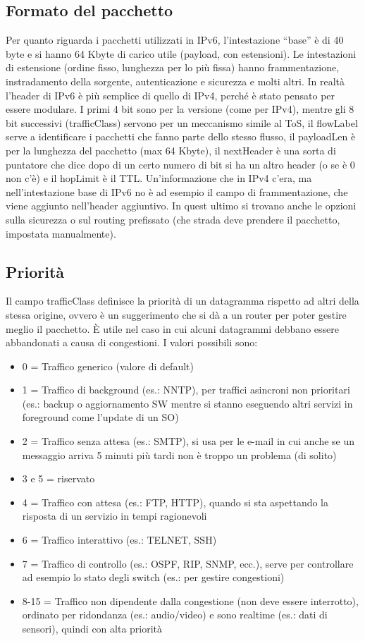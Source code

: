 \subsection{Formato del pacchetto}
Per quanto riguarda i pacchetti utilizzati in IPv6, l’intestazione “base” è di 40 byte e si hanno 64 Kbyte di carico utile (payload, con estensioni). Le intestazioni di estensione (ordine fisso, lunghezza per lo più fissa) hanno frammentazione, instradamento della sorgente, autenticazione e sicurezza e molti altri. In realtà l’header di IPv6 è più semplice di quello di IPv4, perché è stato pensato per essere modulare. I primi 4 bit sono per la versione (come per IPv4), mentre gli 8 bit successivi (trafficClass) servono per un meccanismo simile al ToS, il flowLabel serve a identificare i pacchetti che fanno parte dello stesso flusso, il payloadLen è per la lunghezza del pacchetto (max 64 Kbyte), il nextHeader è una sorta di puntatore che dice dopo di un certo numero di bit si ha un altro header (o se è 0 non c’è) e il hopLimit è il TTL. Un’informazione che in IPv4 c’era, ma nell’intestazione base di IPv6 no è ad esempio il campo di frammentazione, che viene aggiunto nell’header aggiuntivo. In quest ultimo si trovano anche le opzioni sulla sicurezza o sul routing prefissato (che strada deve prendere il pacchetto, impostata manualmente).
\subsection{Priorità}
Il campo trafficClass definisce la priorità di un datagramma rispetto ad altri della stessa origine, ovvero è un suggerimento che si dà a un router per poter gestire meglio il pacchetto. È utile nel caso in cui alcuni datagrammi debbano essere abbandonati a causa di congestioni. I valori possibili sono:
\begin{itemize}
  \item 0 = Traffico generico (valore di default)
  \item 1 = Traffico di background (es.: NNTP), per traffici asincroni non prioritari (es.: backup o aggiornamento SW mentre si stanno eseguendo altri servizi in foreground come l’update di un SO)
  \item 2 = Traffico senza attesa (es.: SMTP), si usa per le e-mail in cui anche se un messaggio arriva 5 minuti più tardi non è troppo un problema (di solito)
  \item 3 e 5 = riservato
  \item 4 = Traffico con attesa (es.: FTP, HTTP), quando si sta aspettando la risposta di un servizio in tempi ragionevoli
  \item 6 = Traffico interattivo (es.: TELNET, SSH)
  \item 7 = Traffico di controllo (es.: OSPF, RIP, SNMP, ecc.), serve per controllare ad esempio lo stato degli switch (es.: per gestire congestioni)
  \item 8-15 = Traffico non dipendente dalla congestione (non deve essere interrotto), ordinato per ridondanza (es.: audio/video) e sono realtime (es.: dati di sensori), quindi con alta priorità
\end{itemize}
